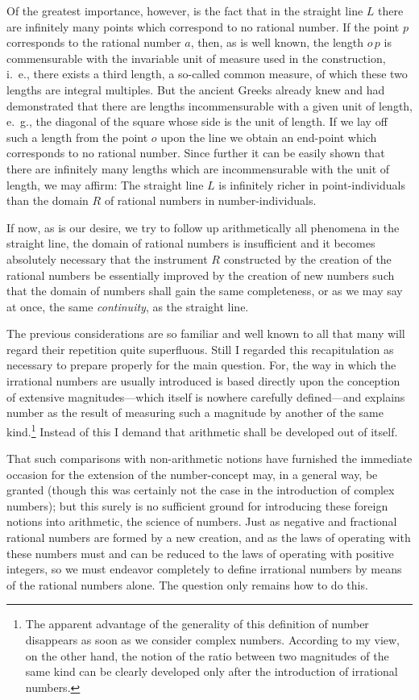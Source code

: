 \documentclass[twoside,openright]{article}
\begin{document}
Of the greatest importance, however, is the fact that in the straight
line $L$ there are infinitely many points which correspond to no
rational number. If the point $p$ corresponds to the rational number
$a$, then, as is well known, the length $o\,p$ is commensurable with
the invariable unit of measure used in the construction, i.~e., there
exists a third length, a so-called common measure, of which these two
lengths are integral multiples. But the ancient Greeks already knew
and had demonstrated that there are lengths incommensurable with a
given unit of length, e.~g., the diagonal of the square whose side is
the unit of length.  If we lay off such a length from the point $o$
upon the line we obtain an end-point which corresponds to no rational
number. Since further it can be easily shown that there are infinitely
many lengths which are incommensurable with the unit of length, we may
affirm: The straight line $L$ is infinitely richer in
point-individuals than the domain $R$ of rational numbers in
number-individuals.

If now, as is our desire, we try to follow up arithmetically all
phenomena in the straight line, the domain of rational numbers is
insufficient and it becomes absolutely necessary that the instrument
$R$ constructed by the creation of the rational numbers be essentially
improved by the creation of new numbers such that the domain of
numbers shall gain the same completeness, or as we may say at once,
the same \textit{continuity}, as the straight line.

The previous considerations are so familiar and well known to all that
many will regard their repetition quite superfluous. Still I regarded
this recapitulation as necessary to prepare properly for the main
question. For, the way in which the irrational numbers are usually
introduced is based directly upon the conception of extensive
magnitudes---which itself is nowhere carefully defined---and explains
number as the result of measuring such a magnitude by another of the
same kind.\footnote{The apparent advantage of the generality of this
  definition of number disappears as soon as we consider complex
  numbers. According to my view, on the other hand, the notion of the
  ratio between two magnitudes of the same kind can be clearly
  developed only after the introduction of irrational numbers.}
Instead of this I demand that arithmetic shall be developed out of
itself.

That such comparisons with non-arithmetic notions have furnished the
immediate occasion for the extension of the number-concept may, in a
general way, be granted (though this was certainly not the case in the
introduction of complex numbers); but this surely is no sufficient
ground for introducing these foreign notions into arithmetic, the
science of numbers. Just as negative and fractional rational numbers
are formed by a new creation, and as the laws of operating with these
numbers must and can be reduced to the laws of operating with positive
integers, so we must endeavor completely to define irrational numbers
by means of the rational numbers alone. The question only remains how
to do this.
\end{document}
